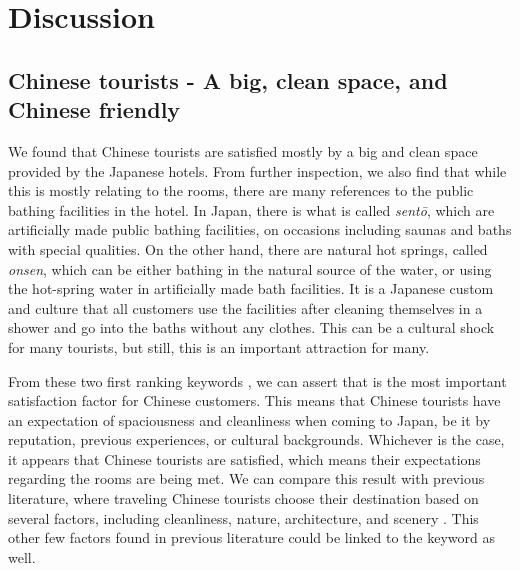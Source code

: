 \section{Discussion}\label{discussion}

\DIFaddbegin {}

\DIFaddend \subsection{Chinese tourists - A big, clean space, and Chinese friendly}\label{disc:zh}

We found that Chinese tourists are satisfied mostly by a big and clean space provided by the Japanese hotels. From further inspection, we also find that while this is mostly relating to the rooms, there are many references to the public bathing facilities in the hotel. In Japan, there is what is called \textit{sent\=o}, which are artificially made public bathing facilities, on occasions including saunas and baths with special qualities. On the other hand, there are natural hot springs, called \textit{onsen}, which can be either bathing in the natural source of the water, or using the hot-spring water in artificially made bath facilities. It is a Japanese custom and culture that all customers use the facilities after cleaning themselves in a shower and go into the baths without any clothes. This can be a cultural shock for many tourists, but still, this is an important attraction for many.

From these two first ranking keywords \DIFaddbegin {}\DIFaddend , we can assert that \DIFdelbegin {}\DIFdelend \DIFaddbegin {}\DIFaddend is the most important satisfaction factor for Chinese customers. This means that Chinese tourists have an expectation of spaciousness and cleanliness when coming to Japan, be it by reputation, previous experiences, or cultural backgrounds. Whichever is the case, it appears that Chinese tourists are satisfied, which means their expectations regarding the rooms are being met. We can compare this result with previous literature, where traveling Chinese tourists choose their destination based on several factors, including cleanliness, nature, architecture, and scenery \cite[][]{ryan2001}. This other few factors found in previous literature could be linked to the keyword \DIFdelbegin {}\DIFdelend \DIFaddbegin {}\DIFaddend as well.

